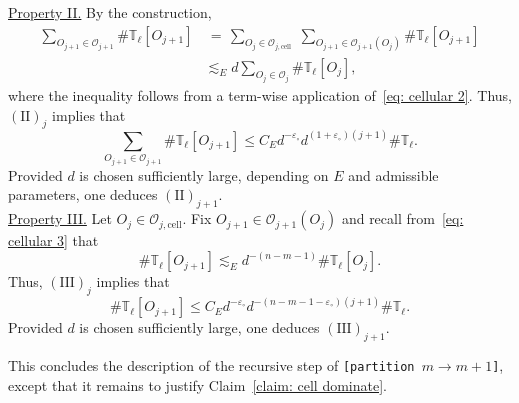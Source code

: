 \documentclass[reqno]{amsart}
\numberwithin{equation}{section}
\newcommand{\T}{\mathbb{T}}
\newcommand{\cO}{\mathcal{O}}
\theoremstyle{plain}
\theoremstyle{definition}
\begin{document}
%
%
%
\noindent\underline{Property II.} By the construction,
\begin{align*}
    \sum_{O_{j+1} \in \cO_{j+1}} \#\T_{\ell}[O_{j+1}] &\,=\, \sum_{O_j\in \cO_{j,\mathrm{cell}}}\; \sum_{O_{j+1} \in \cO_{j+1}(O_j)} \#\T_{\ell}[O_{j+1}]  \\
    &\lesssim_E d \sum_{O_j \in \cO_j} \#\T_{\ell}[O_j], 
\end{align*}
where the inequality follows from a term-wise application of~\eqref{eq: cellular 2}. Thus, $(\mathrm{II})_j$ implies that
\begin{equation*}
    \sum_{O_{j+1} \in \cO_{j+1}} \#\T_{\ell}[O_{j+1}] \leq C_E d^{-\varepsilon_{\circ}} d^{(1+\varepsilon_{\circ})(j+1)}  \#\T_{\ell}.
\end{equation*}
Provided $d$ is chosen sufficiently large, depending on $E$ and admissible parameters, one deduces $(\mathrm{II})_{j+1}$.\\

%
%
%
\noindent\underline{Property III.} Let $O_j\in \cO_{j,\mathrm{cell}}$. Fix $O_{j+1} \in \cO_{j+1}(O_j)$ and recall from~\eqref{eq: cellular 3} that
\begin{equation*}
    \#\T_{\ell}[O_{j+1}] \lesssim_E d^{-(n - m - 1)}\#\T_{\ell}[O_{j}].
\end{equation*}
Thus, $(\mathrm{III})_j$ implies that
\begin{equation*}
    \#\T_{\ell}[O_{j+1}]\leq C_E d^{-\varepsilon_{\circ}} d^{-(n-m-1-\varepsilon_{\circ})(j+1)} \#\T_{\ell}.
\end{equation*}
Provided $d$ is chosen sufficiently large, one deduces $(\mathrm{III})_{j+1}$.\medskip

This concludes the description of the recursive step of \texttt{[partition $m \to m+1$]}, except that it remains to justify Claim~\ref{claim: cell dominate}. 
\end{document}

